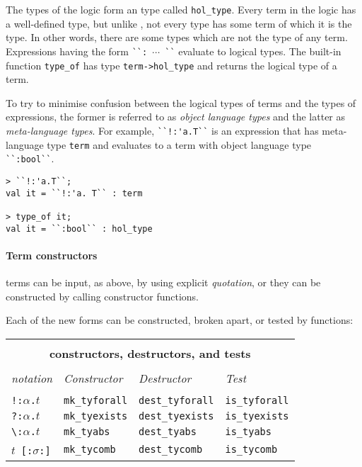 The types of the \HOLW{} logic form an \ML{} type called
{\small\verb|hol_type|}.  Every term in the logic has a well-defined type,
but unlike \HOL{}, not every type has some term of which it is the type.
In other words, there are some types which are not the type of any term.
Expressions having the form
{\small\verb|``: |}$\cdots${\small\verb| ``|} evaluate to logical
types.  The built-in function {\small\verb|type_of|} has \ML{} type
{\small\verb|term->hol_type|} and returns the logical type of a term.

To try to minimise confusion between the logical types of \HOLW{} terms and
the \ML{} types of \ML{} expressions, the former is referred to as {\it object
language types\/} and the latter as {\it meta-language types\/}.  For example,
{\small\verb|``!:'a.T``|} is an \ML{} expression that has meta-language type
{\small\verb|term|} and evaluates to a term with object language type
{\small\verb|``:bool``|}.
%
\begin{session}
\begin{verbatim}
> ``!:'a.T``;
val it = ``!:'a. T`` : term

> type_of it;
val it = ``:bool`` : hol_type
\end{verbatim}
\end{session}

%
\paragraph{Term constructors}
\HOLW{} terms can be input, as above, by using explicit {\it
quotation\/}, or they can be constructed by calling \ML{} constructor
functions.

Each of the new forms can be constructed, broken apart, or tested
by \ML{} functions:

\begin{center}
\begin{tabular}{|l|l|l|l|} \hline
\multicolumn{4}{|c|}{ } \\
\multicolumn{4}{|c|}{\bf \ML{} constructors, destructors, and tests} \\
\multicolumn{4}{|c|}{ } \\
{\it \HOL{${}_\omega$} notation} &
{\it Constructor} &
{\it Destructor} &
{\it Test} \\ \hline
 & & & \\
{\small\verb|!:|}$\alpha${\small\verb|.|}$t$ &
\texttt{mk\_tyforall} & \texttt{dest\_tyforall} &
\texttt{is\_tyforall} \\ \hline
{\small\verb|?:|}$\alpha${\small\verb|.|}$t$ &
\texttt{mk\_tyexists} & \texttt{dest\_tyexists} &
\texttt{is\_tyexists} \\ \hline
{\small\verb|\:|}$\alpha${\small\verb|.|}$t$ &
\texttt{mk\_tyabs} & \texttt{dest\_tyabs} &
\texttt{is\_tyabs} \\ \hline
$t$\ {\small\verb|[:|}$\sigma${\small\verb|:]|} &
\texttt{mk\_tycomb} & \texttt{dest\_tycomb} &
\texttt{is\_tycomb} \\ \hline
\end{tabular}
\end{center}\label{construct-destruct-table}

